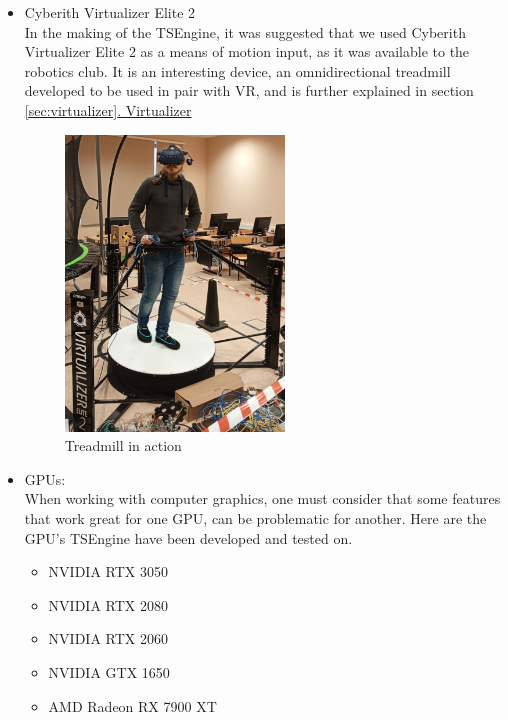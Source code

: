 \begin{itemize}
\begin{itemize}
    \end{itemize}
    \item Cyberith Virtualizer Elite 2\\
    In the making of the TSEngine, it was suggested  that we used Cyberith Virtualizer Elite 2 as a means of motion input, as it was available to the robotics club. It is an interesting device, an omnidirectional treadmill developed to be used in pair with VR, and is further explained in section \hyperref[sec:virtualizer]{\ref*{sec:virtualizer}. Virtualizer}
    \begin{figure}[H]
    \begin{center}
     \includegraphics[width=0.55\textwidth]{figures/dominik.png}
    \end{center}
      \caption{Treadmill in action}
    \end{figure}
    \item GPUs:\\
    When working with computer graphics, one must consider that some features that work great for one GPU, can be problematic for another. Here are the GPU's TSEngine have been developed and tested on.
    \begin{itemize}
        \item NVIDIA RTX 3050\\
        \item NVIDIA RTX 2080\\
        \item NVIDIA RTX 2060\\
        \item NVIDIA GTX 1650\\
        \item AMD Radeon RX 7900 XT\\
    \end{itemize}
\end{itemize}
  

